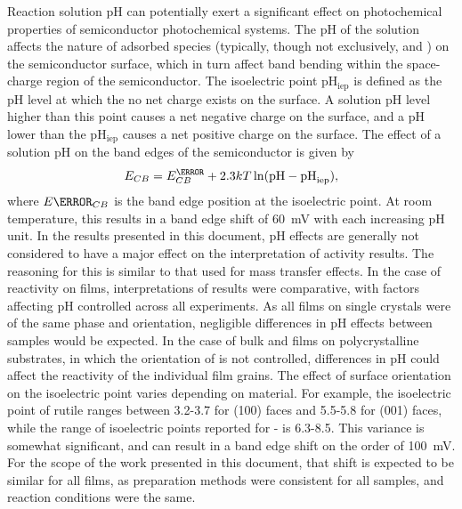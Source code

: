 \label{ph}
Reaction solution pH can potentially exert a significant effect on photochemical properties of semiconductor photochemical systems. The pH of the solution affects the nature of adsorbed species (typically, though not exclusively,  and ) on the semiconductor surface, which in turn affect band bending within the space-charge region of the semiconductor. The isoelectric point pH$_{\text{iep}}$ is defined as the pH level at which the no net charge exists on the surface. A solution pH level higher than this point causes a net negative charge on the surface, and a pH lower than the pH$_{\text{iep}}$ causes a net positive charge on the surface. The effect of a solution pH on the band edges of the semiconductor is given by
\begin{equation}
E_{CB}=E^{\degree}_{CB}+2.3kT\ln(\text{pH}-\text{pH}_{\text{iep}}),
\end{equation}
where $E{\degree}_{CB}$ is the band edge position at the isoelectric point. At room temperature, this results in a band edge shift of \SI{60}{\milli\volt} with each increasing pH unit. In the results presented in this document, pH effects are generally not considered to have a major effect on the interpretation of activity results. The reasoning for this is similar to that used for mass transfer effects.  In the case of reactivity on  films, interpretations of results were comparative, with factors affecting pH controlled across all experiments. As all films on single crystals were of the same phase and orientation, negligible differences in pH effects between samples would be expected. In the case of bulk  and  films on polycrystalline substrates, in which the orientation of  is not controlled, differences in pH could affect the reactivity of the individual film grains. The effect of surface orientation on the isoelectric point varies depending on material. For example, the isoelectric point of rutile  ranges between 3.2-3.7 for (100) faces and 5.5-5.8 for (001) faces,\cite{Bullard:2006jv} while the range of isoelectric points reported for \textalpha- is 6.3-8.5.\cite{Parks:1965ys,Kosmulski:2004vn,Kosmulski:2002kx,Kosmulski:2001ww} This variance is somewhat significant, and can result in a band edge shift on the order of \SI{100}{\milli\volt}. For the scope of the work presented in this document, that shift is expected to be similar for all films, as preparation methods were consistent for all samples, and reaction conditions were the same. 

